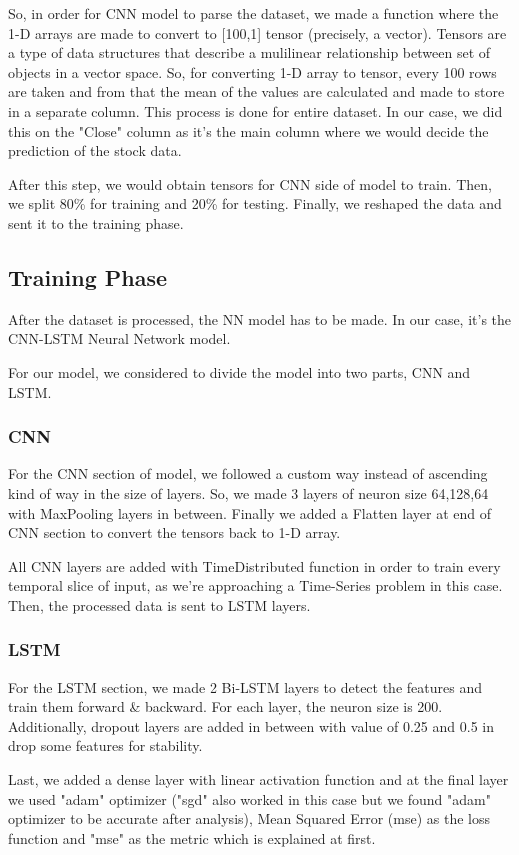 \documentclass[conference]{IEEEtran}
\begin{document}
So, in order for CNN model to parse the dataset, we made a function where the 1-D arrays are made to convert to [100,1] tensor (precisely, a vector). Tensors are a type of data structures that describe a mulilinear relationship between set of objects in a vector space. So, for converting 1-D array to tensor, every 100 rows are taken and from that the mean of the values are calculated and made to store in a separate column. This process is done for entire dataset. In our case, we did this on the "Close" column as it's the main column where we would decide the prediction of the stock data.

After this step, we would obtain tensors for CNN side of model to train. Then, we split 80\% for training and 20\% for testing. Finally, we reshaped the data and sent it to the training phase. 

\subsection{Training Phase}\label{B}
After the dataset is processed, the NN model has to be made. In our case, it's the CNN-LSTM Neural Network model. 

For our model, we considered to divide the model into two parts, CNN and LSTM.

\subsubsection{CNN}
For the CNN section of model, we followed a custom way instead of ascending kind of way in the size of layers. So, we made 3 layers of neuron size 64,128,64 with MaxPooling layers in between. Finally we added a Flatten layer at end of CNN section to convert the tensors back to 1-D array.

All CNN layers are added with TimeDistributed function in order to train every temporal slice of input, as we're approaching a Time-Series problem in this case. Then, the processed data is sent to LSTM layers.

\subsubsection{LSTM}
For the LSTM section, we made 2 Bi-LSTM layers to detect the features and train them forward \& backward. For each layer, the neuron size is 200. Additionally, dropout layers are added in between with value of 0.25 and 0.5 in drop some features for stability.

Last, we added a dense layer with linear activation function and at the final layer we used "adam" optimizer ("sgd" also worked in this case but we found "adam" optimizer to be accurate after analysis), Mean Squared Error (mse) as the loss function and "mse" as the metric which is explained at first.
\end{document}
